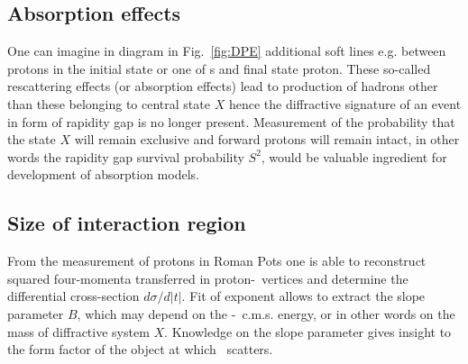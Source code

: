 \subsection{Absorption effects}

One can imagine in diagram in Fig.~\ref{fig:DPE} additional soft lines e.g. between protons in the initial state or one of \Pomeron s and final state proton. These so-called rescattering effects (or absorption effects) lead to production of hadrons other than these belonging to central state $X$ hence the diffractive signature of an event in form of rapidity gap is no longer present. Measurement of the probability that the state $X$ will remain exclusive and forward protons will remain intact, in other words the rapidity gap survival probability $S^{2}$, would be valuable ingredient for development of absorption models.

\subsection{Size of interaction region}

From the measurement of protons in Roman Pots one is able to reconstruct squared four-momenta transferred in proton-\Pomeron\ vertices and determine the differential cross-section $d\sigma/d|t|$. Fit of exponent allows to extract the slope parameter $B$, which may depend on the \Pomeron-\Pomeron\ c.m.s. energy, or in other words on the mass of diffractive system $X$. Knowledge on the slope parameter gives insight to the form factor of the object at which \Pomeron\ scatters.
